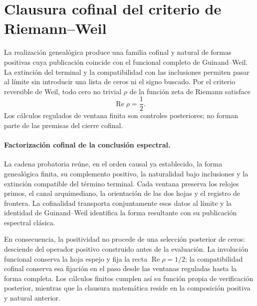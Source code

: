 \section{Clausura cofinal del criterio de Riemann--Weil}

La realización genealógica produce una familia cofinal y natural de formas
positivas cuya publicación coincide con el funcional completo de
Guinand--Weil. La extinción del terminal y la compatibilidad con las
inclusiones permiten pasar al límite sin introducir una lista de ceros ni el
signo buscado. Por el criterio reversible de Weil, todo cero no trivial
\(\rho\) de la función zeta de Riemann satisface
\[
  \operatorname{Re}\rho=\frac12.
\]
Los cálculos regulados de ventana finita son controles posteriores; no forman
parte de las premisas del cierre cofinal.

\paragraph{Factorización cofinal de la conclusión espectral.}
La cadena probatoria reúne, en el orden causal ya establecido, la forma
genealógica finita, su complemento positivo, la naturalidad bajo inclusiones y
la extinción compatible del término terminal. Cada ventana preserva los relojes
primos, el canal arquimediano, la orientación de las dos hojas y el registro de
frontera. La cofinalidad transporta conjuntamente esos datos al límite y la
identidad de Guinand--Weil identifica la forma resultante con su publicación
espectral clásica.

En consecuencia, la positividad no procede de una selección posterior de
ceros: desciende del operador positivo construido antes de la evaluación. La
involución funcional conserva la hoja espejo y fija la recta
\(\operatorname{Re}\rho=1/2\); la compatibilidad cofinal conserva esa fijación
en el paso desde las ventanas reguladas hasta la forma completa. Los cálculos
finitos cumplen así su función propia de verificación posterior, mientras que
la clausura matemática reside en la composición positiva y natural anterior.


